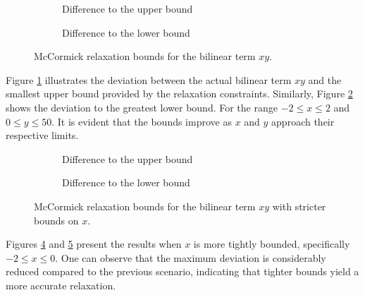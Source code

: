 \begin{figure}[h]
	\centering
	\begin{subfigure}[b]{0.45\textwidth}
		\centering
		\resizebox{\textwidth}{!}{}
		\caption{Difference to the upper bound}
		\label{fig:mccormick_0_upper}
	\end{subfigure}
	\hfill
	\begin{subfigure}[b]{0.45\textwidth}
		\centering
		\resizebox{\textwidth}{!}{}
		\caption{Difference to the lower bound}
		\label{fig:mccormick_0_lower}
	\end{subfigure}
	\caption{McCormick relaxation bounds for the bilinear term \( xy \).}
	\label{fig:mccormick_bounds_0}
\end{figure}

Figure \ref{fig:mccormick_0_upper} illustrates the deviation between the actual bilinear term \(xy \) and the smallest upper bound provided by the
relaxation constraints.
Similarly, Figure \ref{fig:mccormick_0_lower} shows the deviation to the greatest lower bound.
For the range \( -2 \leq x \leq 2 \) and \( 0 \leq y \leq 50 \).
It is evident that the bounds improve as \( x \) and \( y \) approach their respective limits.

\begin{figure}[h]
	\centering
	\begin{subfigure}[b]{0.45\textwidth}
		\centering
		\resizebox{\textwidth}{!}{}
		\caption{Difference to the upper bound}
		\label{fig:mccormick_1_upper}
	\end{subfigure}
	\hfill
	\begin{subfigure}[b]{0.45\textwidth}
		\centering
		\resizebox{\textwidth}{!}{}
		\caption{Difference to the lower bound}
		\label{fig:mccormick_1_lower}
	\end{subfigure}
	\caption{McCormick relaxation bounds for the bilinear term \(  xy \) with stricter bounds on \( x \).}
	\label{fig:mccormick_bounds_1}
\end{figure}

Figures \ref{fig:mccormick_1_upper} and \ref{fig:mccormick_1_lower} present the results when \( x \) is more tightly bounded, specifically \( -2 \leq
x \leq 0 \).
One can observe that the maximum deviation is considerably reduced compared to the previous scenario, indicating that tighter bounds yield a more
accurate relaxation.

